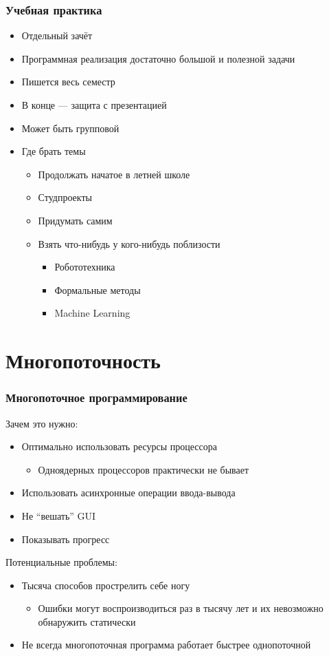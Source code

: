 \documentclass[xetex,mathserif,serif]{beamer}
\begin{document}
	\begin{frame}
		\frametitle{Учебная практика}
		\begin{itemize}
			\item Отдельный зачёт
			\item Программная реализация достаточно большой и полезной задачи
			\item Пишется весь семестр
			\item В конце --- защита с презентацией
			\item Может быть групповой
			\item Где брать темы
			\begin{itemize}
				\item Продолжать начатое в летней школе
				\item Студпроекты
				\item Придумать самим
				\item Взять что-нибудь у кого-нибудь поблизости
				\begin{itemize}
					\item Робототехника
					\item Формальные методы
					\item Machine Learning
				\end{itemize}
			\end{itemize}
		\end{itemize}
	\end{frame}

	\section{Многопоточность}

	\begin{frame}
		\frametitle{Многопоточное программирование}
		Зачем это нужно:
		\begin{itemize}
			\item Оптимально использовать ресурсы процессора
			\begin{itemize}
				\item Одноядерных процессоров практически не бывает
			\end{itemize}
			\item Использовать асинхронные операции ввода-вывода
			\item Не ``вешать'' GUI
			\item Показывать прогресс
		\end{itemize}
		\vspace{5mm}
		Потенциальные проблемы:
		\begin{itemize}
			\item Тысяча способов прострелить себе ногу
			\begin{itemize}
				\item Ошибки могут воспроизводиться раз в тысячу лет и их невозможно обнаружить статически
			\end{itemize}
			\item Не всегда многопоточная программа работает быстрее однопоточной
		\end{itemize}
	\end{frame}
\end{document}

